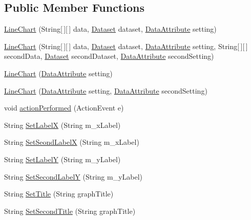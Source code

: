 \subsection*{Public Member Functions}
\begin{DoxyCompactItemize}
\item 
\hyperlink{class_line_chart_a72fd793f59eb636f6898b73faf9a6a51}{Line\-Chart} (String\mbox{[}$\,$\mbox{]}\mbox{[}$\,$\mbox{]} data, \hyperlink{class_dataset}{Dataset} dataset, \hyperlink{class_data_attribute}{Data\-Attribute} setting)
\item 
\hyperlink{class_line_chart_a23bb447a62c77b3a383022ebeb71671e}{Line\-Chart} (String\mbox{[}$\,$\mbox{]}\mbox{[}$\,$\mbox{]} data, \hyperlink{class_dataset}{Dataset} dataset, \hyperlink{class_data_attribute}{Data\-Attribute} setting, String\mbox{[}$\,$\mbox{]}\mbox{[}$\,$\mbox{]} second\-Data, \hyperlink{class_dataset}{Dataset} second\-Dataset, \hyperlink{class_data_attribute}{Data\-Attribute} second\-Setting)
\item 
\hyperlink{class_line_chart_a4fe8691f64b91f0b18b54696b75e2741}{Line\-Chart} (\hyperlink{class_data_attribute}{Data\-Attribute} setting)
\item 
\hyperlink{class_line_chart_a04d4c60dedbe697b63370bd90414967f}{Line\-Chart} (\hyperlink{class_data_attribute}{Data\-Attribute} setting, \hyperlink{class_data_attribute}{Data\-Attribute} second\-Setting)
\item 
void \hyperlink{class_line_chart_a4c982382761a6da94b9ced6ab33ff171}{action\-Performed} (Action\-Event e)
\item 
String \hyperlink{class_line_chart_a94c65c917dd3d6e0e6e7498f9b68913f}{Set\-Label\-X} (String m\-\_\-x\-Label)
\item 
String \hyperlink{class_line_chart_a64bfe8a0a1a86efad6b5fdaf9ec5d349}{Set\-Seond\-Label\-X} (String m\-\_\-x\-Label)
\item 
String \hyperlink{class_line_chart_ad8947897530ac460222792e166c46880}{Set\-Label\-Y} (String m\-\_\-y\-Label)
\item 
String \hyperlink{class_line_chart_ad3254d9956692f4bddc7ede0951a648d}{Set\-Second\-Label\-Y} (String m\-\_\-y\-Label)
\item 
String \hyperlink{class_line_chart_a22370334f144ff41b288f09aeff798ea}{Set\-Title} (String graph\-Title)
\item 
String \hyperlink{class_line_chart_a27a8002b045b904d09c8d345fb6595a2}{Set\-Second\-Title} (String graph\-Title)
\end{DoxyCompactItemize}

